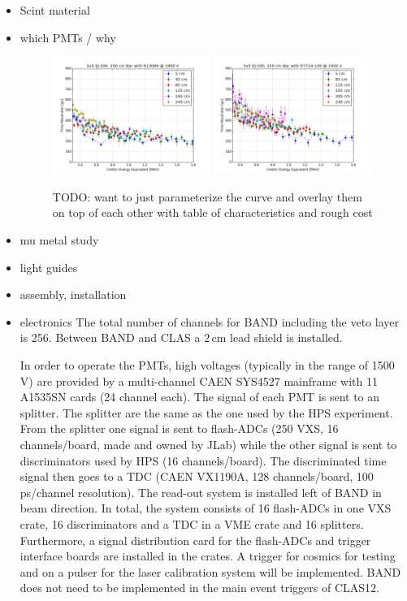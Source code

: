 \documentclass[review]{elsarticle}
\begin{document}
\begin{itemize}
\item Scint material
\item which PMTs / why
\begin{figure}[thb]
\centering
\includegraphics[width=0.48\textwidth]{R13089.png}
\includegraphics[width=0.48\textwidth]{R7724-100.png}
\caption{TODO: want to just parameterize the curve and overlay them on top of each other with table of characteristics and rough cost }
\label{fig:bandpmts}
\end{figure}

\item mu metal study
\item light guides
\item assembly, installation
\item electronics
The total number of channels for BAND including the veto layer is 256. Between BAND and CLAS a $2\,\mathrm{cm}$ lead shield is installed.


In order to operate the PMTs, high voltages (typically in the range of 1500 V) are provided by a multi-channel CAEN SYS4527 mainframe with 11 A1535SN cards (24 channel each).
The signal of each PMT is sent to an splitter. The splitter are the same as the one used by the HPS experiment.
From the splitter one signal is sent to flash-ADCs (250 VXS, 16 channels/board, made and owned by JLab) while the other signal is sent to  discriminators used by HPS (16 channels/board).
The discriminated time signal then goes to a TDC (CAEN VX1190A, 128 channels/board, 100 ps/channel resolution). The read-out system is installed left of BAND in beam direction. 
In total, the system consists of 16 flash-ADCs in one VXS crate, 16 discriminators and a TDC in a VME crate and 16 splitters.  Furthermore, a signal distribution card for the flash-ADCs and trigger interface boards are installed in the crates. A trigger for cosmics for testing and on a pulser for the laser calibration system will be implemented. BAND does not need to be implemented in the main event triggers of CLAS12.



\end{itemize}
\end{document}
